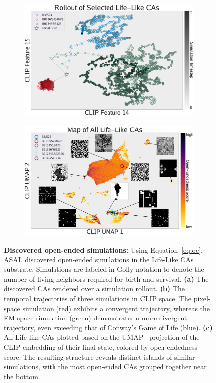 \documentclass{article}
\begin{document}
\begin{figure}[htbp]
    \begin{subfigure}{0.48\textwidth}
        \centering
        \includegraphics[width=\textwidth]{figs/oe_gol_2-min.png}
        \caption{}
        \label{fig:oe_gol_2}
    \end{subfigure}
    \hfill
    \begin{subfigure}{0.49\textwidth}
        \centering
        \includegraphics[width=\textwidth]{figs/oe_gol_3-min.png}
        \caption{}
        \label{fig:oe_gol_3}
    \end{subfigure}
    \caption{
        \textbf{Discovered open-ended simulations: }
        Using Equation~\ref{eq:oe}, ASAL discovered open-ended simulations in the Life-Like CAs substrate.
        Simulations are labeled in Golly notation to denote the number of living neighbors required for birth and survival.
        \textbf{(a)}
        The discovered CAs rendered over a simulation rollout.
        \textbf{(b)}
        The temporal trajectories of three simulations in CLIP space.
        The pixel-space simulation (red) exhibits a convergent trajectory, whereas the FM-space simulation (green) demonstrates a more divergent trajectory, even exceeding that of Conway's Game of Life (blue).
        \textbf{(c)}
        All Life-like CAs plotted based on the UMAP~\citep{mcinnes2018umap} projection of the CLIP embedding of their final state, colored by open-endedness score.
        The resulting structure reveals distinct islands of similar simulations, with the most open-ended CAs grouped together near the bottom.
    }
    \label{fig:oe_gol}
\end{figure}
\end{document}

